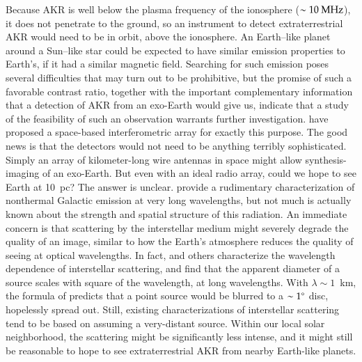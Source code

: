 Because AKR is well below the plasma frequency of the ionosphere
($\sim 10 {\rm~MHz}$), it does not penetrate to the ground, so an
instrument to detect extraterrestrial AKR would need to be in orbit,
above the ionosphere.  An Earth--like planet around a Sun--like star
could be expected to have similar emission properties to Earth's, if
it had a similar magnetic field.  Searching for such emission poses
several difficulties that may turn out to be prohibitive, but the
promise of such a favorable contrast ratio, together with the
important complementary information that a detection of AKR from an
exo-Earth would give us, indicate that a study of the feasibility of
such an observation warrants further
investigation. \citet{janhunen_et_al2003} have proposed a space-based
interferometric array for exactly this purpose.  The good news is that
the detectors would not need to be anything terribly sophisticated.
Simply an array of kilometer-long wire antennas in space might allow
synthesis-imaging of an exo-Earth.  But even with an ideal radio
array, could we hope to see Earth at 10~pc?  The answer is unclear.
\citet{novaco+brown1978} provide a rudimentary characterization of
nonthermal Galactic emission at very long wavelengths, but not much is
actually known about the strength and spatial structure of this
radiation.  An immediate concern is that scattering by the
interstellar medium might severely degrade the quality of an image,
similar to how the Earth's atmosphere reduces the quality of seeing at
optical wavelengths.  In fact, \citet{cohen+cronyn1974} and others
characterize the wavelength dependence of interstellar scattering, and
find that the apparent diameter of a source scales with square of the
wavelength, at long wavelengths.  With $\lambda\sim 1$~km, the formula
of \citet{cohen+cronyn1974} predicts that a point source would be
blurred to a $\sim 1\mbox{$^\circ$}$ disc, hopelessly spread out.  Still,
existing characterizations of interstellar scattering tend to be based
on assuming a very-distant source.  Within our local solar
neighborhood, the scattering might be significantly less intense, and
it might still be reasonable to hope to see extraterrestrial AKR from
nearby Earth-like planets.


